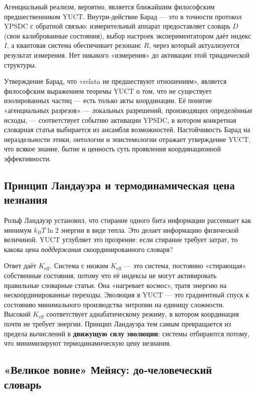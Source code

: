 \documentclass[12pt,a4paper]{article}
\begin{document}
	Агенциальный реализм, вероятно, является ближайшим философским предшественником YUCT. Внутри‑действие Барад — это в точности протокол YPSDC с обратной связью: измерительный аппарат предоставляет словарь \(D\) (свои калиброванные состояния), выбор настроек экспериментатором даёт индекс \(I\), а квантовая система обеспечивает резонанс \(R\), через который актуализуется результат измерения. Нет никакого «измерения» до активации этой триадической структуры.
	
	Утверждение Барад, что «relata не предшествуют отношениям», является философским выражением теоремы YUCT о том, что не существует изолированных частиц — есть только акты координации. Её понятие «агенциальных разрезов» — локальных разрешений, производящих определённые исходы, — соответствует событию активации YPSDC, в котором конкретная словарная статья выбирается из ансамбля возможностей. Настойчивость Барад на нераздельности этики, онтологии и эпистемологии отражает утверждение YUCT, что всякое знание, бытие и ценность суть проявления координационной эффективности.
	
	\subsection{Принцип Ландауэра и термодинамическая цена незнания}
	
	Рольф Ландауэр установил, что стирание одного бита информации рассеивает как минимум \(k_B T \ln 2\) энергии в виде тепла. Это делает информацию физической величиной. YUCT углубляет это прозрение: если стирание требует затрат, то какова цена \emph{поддержания} скоординированного словаря?
	
	Ответ даёт \(K_{\mathrm{eff}}\). Система с низким \(K_{\mathrm{eff}}\) — это система, постоянно «стирающая» собственные состояния, потому что её индексы не могут активировать правильные словарные статьи. Она «нагревает космос», тратя энергию на нескоординированные переходы. Эволюция в YUCT — это градиентный спуск к состоянию минимального производства энтропии на единицу сложности. Высокий \(K_{\mathrm{eff}}\) соответствует адиабатическому режиму, в котором координация почти не требует энергии. Принцип Ландауэра тем самым превращается из предела вычислений в \textbf{движущую силу эволюции}: системы отбираются потому, что минимизируют термодинамическую цену незнания.
	
	\subsection{«Великое вовне» Мейясу: до‑человеческий словарь}
	
\end{document}
